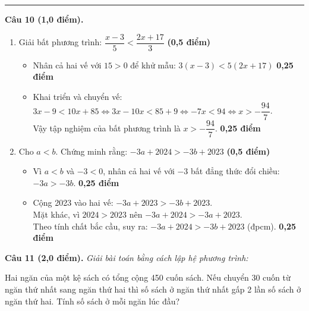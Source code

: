 \documentclass[12pt,a4paper]{article}
\begin{document}
\vspace{2.5mm}
\hrule
\vspace{2.5mm}

\noindent\textbf{Câu 10 (1,0 điểm).}
\begin{enumerate}[label=\arabic*), leftmargin=18pt, itemsep=3pt, parsep=0pt]
  \item Giải bất phương trình: $\dfrac{x - 3}{5} < \dfrac{2x + 17}{3}$ \hfill \textbf{(0,5 điểm)}
  \begin{itemize}[leftmargin=16pt, itemsep=1.5pt, parsep=0pt]
    \item Nhân cả hai vế với $15 > 0$ để khử mẫu: $3(x - 3) < 5(2x + 17)$ \dotfill \textbf{0,25 điểm}
    \item Khai triển và chuyển vế:\\
    $3x - 9 < 10x + 85 \iff 3x - 10x < 85 + 9 \iff -7x < 94 \iff x > -\dfrac{94}{7}$.\\
    Vậy tập nghiệm của bất phương trình là $x > -\dfrac{94}{7}$. \dotfill \textbf{0,25 điểm}
  \end{itemize}

  \item Cho $a < b$. Chứng minh rằng: $-3a + 2024 > -3b + 2023$ \hfill \textbf{(0,5 điểm)}
  \begin{itemize}[leftmargin=16pt, itemsep=1.5pt, parsep=0pt]
    \item Vì $a < b$ và $-3 < 0$, nhân cả hai vế với $-3$ bất đẳng thức đổi chiều: $-3a > -3b$. \dotfill \textbf{0,25 điểm}
    \item Cộng 2023 vào hai vế: $-3a + 2023 > -3b + 2023$.\\
    Mặt khác, vì $2024 > 2023$ nên $-3a + 2024 > -3a + 2023$.\\
    Theo tính chất bắc cầu, suy ra: $-3a + 2024 > -3b + 2023$ (đpcm). \dotfill \textbf{0,25 điểm}
  \end{itemize}
\end{enumerate}

\newpage

\noindent\textbf{Câu 11 (2,0 điểm).} \textit{Giải bài toán bằng cách lập hệ phương trình:}

Hai ngăn của một kệ sách có tổng cộng 450 cuốn sách. Nếu chuyển 30 cuốn từ ngăn thứ nhất sang ngăn thứ hai thì số sách ở ngăn thứ nhất gấp 2 lần số sách ở ngăn thứ hai. Tính số sách ở mỗi ngăn lúc đầu?
\end{document}
